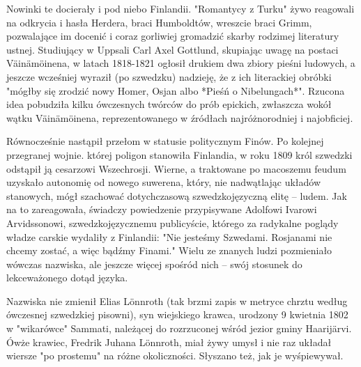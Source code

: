 Nowinki te docierały i pod niebo Finlandii. "Romantycy z Turku" żywo reagowali na odkrycia i hasła Herdera, braci Humboldtów, wreszcie braci Grimm, pozwalające im docenić i coraz gorliwiej gromadzić skarby rodzimej literatury ustnej. Studiujący w Uppsali Carl Axel Gottlund, skupiając uwagę na postaci Väinämöinena, w latach 1818-1821 ogłosił drukiem dwa zbiory pieśni ludowych, a jeszcze wcześniej wyraził (po szwedzku) nadzieję, że z ich literackiej obróbki "mógłby się zrodzić nowy Homer, Osjan albo *Pieśń o Nibelungach*". Rzucona idea pobudziła kilku ówczesnych twórców do prób epickich, zwłaszcza wokół wątku Väinämöinena, reprezentowanego w źródłach najróżnorodniej i najobficiej.

Równocześnie nastąpił przełom w statusie politycznym Finów. Po kolejnej przegranej wojnie. której poligon stanowiła Finlandia, w roku 1809 król szwedzki odstąpił ją cesarzowi Wszechrosji. Wierne, a traktowane po macoszemu feudum uzyskało autonomię od nowego suwerena, który, nie nadwątlając układów stanowych, mógł szachować dotychczasową szwedzkojęzyczną elitę -- ludem. Jak na to zareagowała, świadczy powiedzenie przypisywane Adolfowi Ivarowi Arvidssonowi, szwedzkojęzycznemu publicyście, którego za radykalne poglądy władze carskie wydaliły z Finlandii: "Nie jesteśmy Szwedami. Rosjanami nie chcemy zostać, a więc bądźmy Finami." Wielu ze znanych ludzi pozmieniało wówczas nazwiska, ale jeszcze więcej spośród nich -- swój stosunek do lekceważonego dotąd języka.

Nazwiska nie zmienił Elias Lönnroth (tak brzmi zapis w metryce chrztu według ówczesnej szwedzkiej pisowni), syn wiejskiego krawca, urodzony 9 kwietnia 1802 w "wikarówce" Sammati, należącej do rozrzuconej wśród jezior gminy Haarijärvi. Ówże krawiec, Fredrik Juhana Lönnroth, miał żywy umysł i nie raz układał wiersze "po prostemu" na różne okoliczności. Słyszano też, jak je wyśpiewywał.

